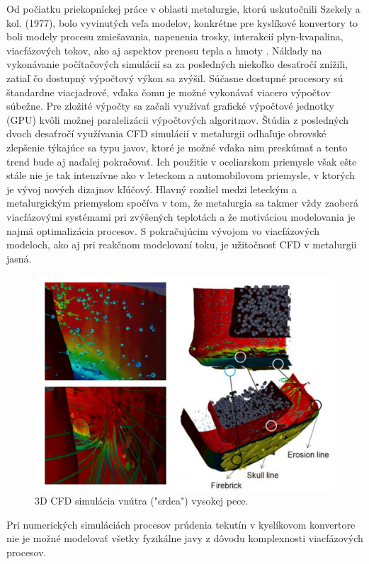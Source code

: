 \documentclass[]{tukediphc}
\begin{document}
Od počiatku priekopníckej práce v oblasti metalurgie, ktorú uskutočnili Szekely a kol. (1977), bolo vyvinutých veľa modelov, konkrétne pre kyslíkové konvertory to boli modely procesu zmiešavania, napenenia trosky, interakcií plyn-kvapalina, viacfázových tokov, ako aj aspektov prenosu tepla a hmoty \citep{chattopadhyay2010}. Náklady na vykonávanie počítačových simulácií sa za posledných niekoľko desaťročí znížili, zatiaľ čo dostupný výpočtový výkon sa zvýšil. Súčasne dostupné procesory sú štandardne viacjadrové, vďaka čomu je možné vykonávať viacero výpočtov súbežne. Pre zložité výpočty sa začali využívať grafické výpočtové jednotky (GPU) kvôli možnej paralelizácii výpočtových algoritmov. Štúdia z posledných dvoch desaťročí \citep{Ersson2018} využívania CFD simulácií v metalurgii odhaľuje obrovské zlepšenie týkajúce sa typu javov, ktoré je možné vďaka  nim preskúmať a tento trend bude  aj naďalej pokračovať. Ich použitie v oceliarskom priemysle však ešte stále nie je tak intenzívne ako v leteckom a automobilovom priemysle, v ktorých je vývoj nových dizajnov kľúčový. Hlavný rozdiel medzi leteckým a metalurgickým priemyslom spočíva v tom, že metalurgia sa takmer vždy zaoberá viacfázovými systémami pri zvýšených teplotách a že motiváciou modelovania je najmä optimalizácia procesov. S pokračujúcim vývojom vo viacfázových modeloch, ako aj pri reakčnom modelovaní toku, je užitočnosť CFD v metalurgii jasná.

\begin{figure}[!ht]
	\centering
	\includegraphics[width=.8\textwidth,angle=0]{figures/blast-furnace-erosion-vr.jpg}
	\caption{3D CFD simulácia vnútra ("srdca") vysokej pece.}
\end{figure}

Pri numerických simuláciách procesov prúdenia tekutín v kyslíkovom konvertore nie je možné modelovať všetky fyzikálne javy z dôvodu komplexnosti viacfázových procesov. 
\end{document}
